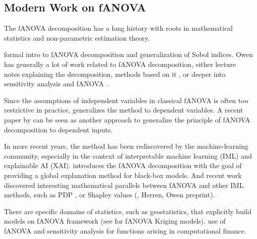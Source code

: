 \subsection{Modern Work on fANOVA}
The fANOVA decomposition has a long history with roots in mathematical statistics and non-parametric estimation theory.

\cite{owen2013} formal intro to fANOVA decomposition and generalization of Sobol indices.
Owen has generally a lot of work related to fANOVA decomposition, either lecture notes explaining the decomposition, methods based on it \cite{owen2003}, or deeper into sensitivity analysis and fANOVA \cite{owen2013}.

Since the assumptions of independent variables in classical fANOVA is often too restrictive in practice, \cite{hooker2007} generalizes the method to dependent variables. A recent paper by \cite{ilidrissi2025} can be seen as another approach to generalize the principle of fANOVA decomposition to dependent inputs.\par

In more recent years, the method has been rediscovered by the machine-learning community, especially in the context of interpretable machine learning (IML) and explainable AI (XAI). \cite{hooker2004} introduces the fANOVA decomposition with the goal of providing a global explanation method for black-box models.
And recent work discovered interesting mathematical parallels between fANOVA and other IML methods, such as PDP \cite{friedman2001}, or Shapley values (\cite{fumagalli2025}, Herren, Owen preprint).

There are specific domains of statistics, such as geostatistics, that explicitly build models on fANOVA framework (see \cite{muehlenstaedt2012} for fANOVA Kriging models).
\cite{liu2006} use of fANOVA and sensitivity analysis for functions arising in computational finance.


